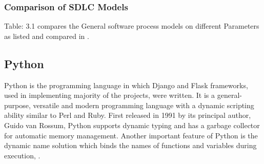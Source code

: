 \subsubsection{Comparison of \ac{SDLC} Models}
Table: 3.1 compares the General software process models on different Parameters as listed and compared in \citet{Sharma:2015}.
\begin{table}[htbp]
	\caption{ Comparison of various \ac{SDLC} Models on different Parameters}
	\label{Table: 3.1}
\end{table}
\subsection{Python}
Python is the programming language in which Django and Flask frameworks, used in implementing majority of the projects, were written. It is a general-purpose, versatile and modern programming language with a dynamic scripting ability similar to Perl and Ruby. First released in 1991 by its principal author, Guido van Rossum, Python supports dynamic typing and has a garbage collector for automatic memory management. Another important feature of Python is the dynamic name solution which binds the names of functions and variables during execution, \citet{Zhou:2010}.
